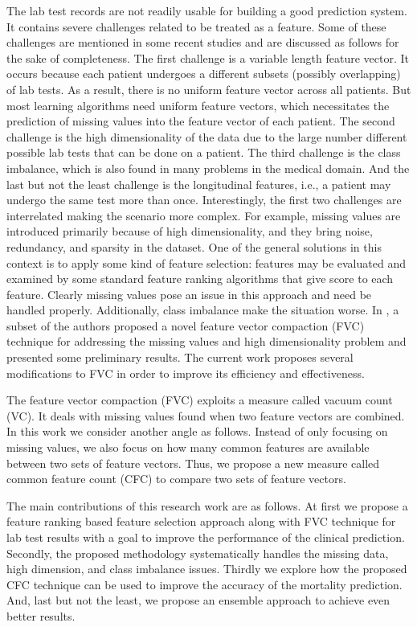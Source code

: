 The lab test records are not readily usable for building a good prediction system. It contains severe challenges related to be treated as a feature. Some of these challenges are mentioned in some recent studies \cite{mehedy-masud:2017:fvc, mehedy-masud:2018:frmwrk} and are discussed as follows for the sake of completeness. The first challenge is a variable length feature vector. It occurs because each patient undergoes a different subsets (possibly overlapping) of lab tests. As a result, there is no uniform feature vector across all patients. But most learning algorithms need uniform feature vectors, which necessitates the prediction of missing values into the feature vector of each patient. The second challenge is the high dimensionality of the data due to the large number different possible lab tests that can be done on a patient. The third challenge is the class imbalance, which is also found in many problems in the medical domain. And the last but not the least challenge is the longitudinal features, i.e., a patient may undergo the same test more than once. Interestingly, the first two challenges are interrelated making the scenario more complex. For example, missing values are introduced primarily because of high dimensionality, and they bring noise, redundancy, and sparsity in the dataset. One of the general solutions in this context is to apply some kind of feature selection: features may be evaluated and examined by some standard feature ranking algorithms that give score to each feature. Clearly missing values pose an issue in this approach and need be handled properly. Additionally, class imbalance make the situation worse. In \cite{mehedy-masud:2017:fvc, mehedy-masud:2018:frmwrk}, a subset of the authors proposed a novel feature vector compaction (FVC) technique for addressing the missing values and high dimensionality problem and presented some preliminary results. The current work proposes several modifications to FVC in order to improve its efficiency and effectiveness.

The feature vector compaction (FVC) exploits a measure called vacuum count (VC). It deals with missing values found when two feature vectors are combined. In this work we consider another angle as follows. Instead of only focusing on missing values, we also focus on how many common features are available between two sets of feature vectors. Thus, we propose a new measure called common feature count (CFC) to compare two sets of feature vectors.    

The main contributions of this research work are as follows. At first we propose a feature ranking based feature selection approach along with FVC technique for lab test results with a goal to improve the performance of the clinical prediction. Secondly, the proposed methodology systematically handles the missing data, high dimension, and class imbalance issues. Thirdly we explore how the proposed CFC technique can be used to improve the accuracy of the mortality prediction. And, last but not the least, we propose an ensemble approach to achieve even better results.
    
